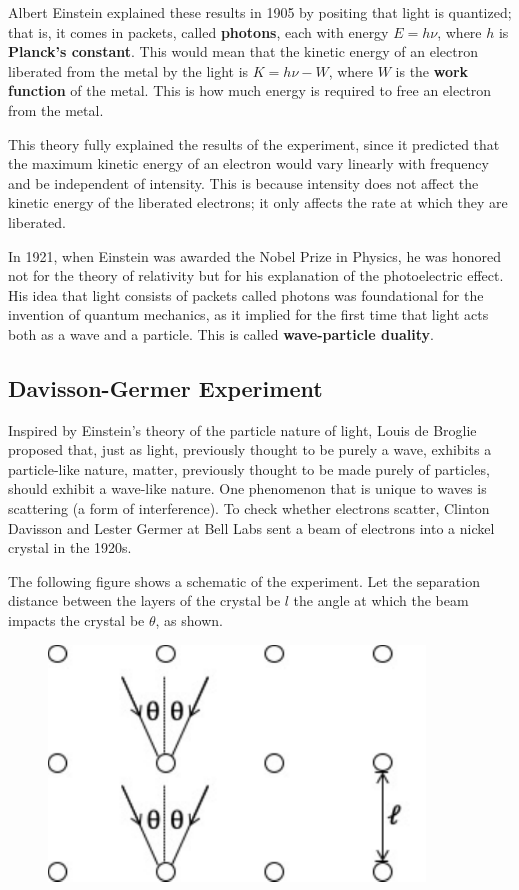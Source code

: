 Albert Einstein explained these results in 1905 by positing that light is quantized; that is, it comes in packets, called \textbf{photons}, each with energy $E = h \nu$, where $h$ is \textbf{Planck's constant}. This would mean that the kinetic energy of an electron liberated from the metal by the light is $K = h\nu - W$, where $W$ is the \textbf{work function} of the metal. This is how much energy is required to free an electron from the metal.

This theory fully explained the results of the experiment, since it predicted that the maximum kinetic energy of an electron would vary linearly with frequency and be independent of intensity. This is because intensity does not affect the kinetic energy of the liberated electrons; it only affects the rate at which they are liberated.

In 1921, when Einstein was awarded the Nobel Prize in Physics, he was honored not for the theory of relativity but for his explanation of the photoelectric effect. His idea that light consists of packets called photons was foundational for the invention of quantum mechanics, as it implied for the first time that light acts both as a wave and a particle. This is called \textbf{wave-particle duality}.
\subsection{Davisson-Germer Experiment}
Inspired by Einstein's theory of the particle nature of light, Louis de Broglie proposed that, just as light, previously thought to be purely a wave, exhibits a particle-like nature, matter, previously thought to be made purely of particles, should exhibit a wave-like nature. One phenomenon that is unique to waves is scattering (a form of interference). To check whether electrons scatter, Clinton Davisson and Lester Germer at Bell Labs sent a beam of electrons into a nickel crystal in the 1920s. 

The following figure shows a schematic of the experiment. Let the separation distance between the layers of the crystal be $l$ the angle at which the beam impacts the crystal be $\theta$, as shown.
\begin{figure}[ht]
\centering
\includegraphics[width=100mm]{images/quantum/dgschem.pdf}
\end{figure}

